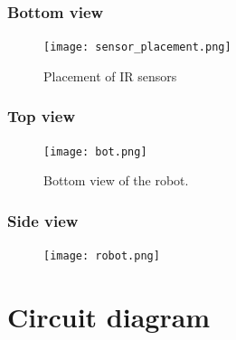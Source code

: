 \documentclass[14pt,a4paper]{extarticle}
\begin{document}
		\subsubsection{Bottom view}
			
			\begin{figure} [H]
				\texttt{[image: sensor\_placement.png]}
				\caption{Placement of IR sensors}
			\end{figure}
			
			\subsubsection{Top view}
			
			\begin{figure}[H]
				\texttt{[image: bot.png]}
				\caption{Bottom view of the robot.}
				\end{figure}
				
			\subsubsection{Side view}
				
				\begin{figure}[H]
					\texttt{[image: robot.png]}
				\end{figure}
			
	
	\section{Circuit diagram}
	
\end{document}
